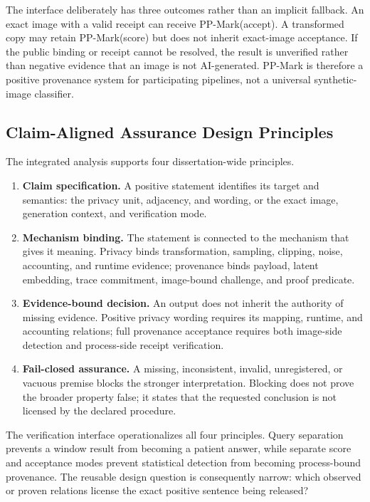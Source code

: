 The interface deliberately has three outcomes rather than an implicit fallback.
An exact image with a valid receipt can receive PP-Mark(accept).  A transformed
copy may retain PP-Mark(score) but does not inherit exact-image acceptance.  If the
public binding or receipt cannot be resolved, the result is unverified rather than
negative evidence that an image is not AI-generated.  PP-Mark is therefore a
positive provenance system for participating pipelines, not a universal synthetic-
image classifier.

\subsection{Claim-Aligned Assurance Design Principles}
\label{subsec:ch5-caa-principles}

The integrated analysis supports four dissertation-wide principles.

\begin{enumerate}
    \item \textbf{Claim specification.}  A positive statement identifies its
    target and semantics: the privacy unit, adjacency, and wording, or the exact
    image, generation context, and verification mode.

    \item \textbf{Mechanism binding.}  The statement is connected to the mechanism
    that gives it meaning.  Privacy binds transformation, sampling, clipping,
    noise, accounting, and runtime evidence; provenance binds payload, latent
    embedding, trace commitment, image-bound challenge, and proof predicate.

    \item \textbf{Evidence-bound decision.}  An output does not inherit the
    authority of missing evidence.  Positive privacy wording requires its mapping,
    runtime, and accounting relations; full provenance acceptance requires both
    image-side detection and process-side receipt verification.

    \item \textbf{Fail-closed assurance.}  A missing, inconsistent, invalid,
    unregistered, or vacuous premise blocks the stronger interpretation.  Blocking
    does not prove the broader property false; it states that the requested
    conclusion is not licensed by the declared procedure.
\end{enumerate}

The verification interface operationalizes all four principles.  Query separation
prevents a window result from becoming a patient answer, while separate score and
acceptance modes prevent statistical detection from becoming process-bound
provenance.  The reusable design question is consequently narrow: which observed
or proven relations license the exact positive sentence being released?



